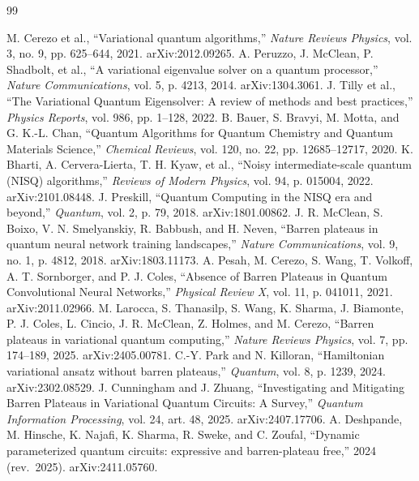 \documentclass[11pt]{article}
\begin{document}

\begin{thebibliography}{99}

 M. Cerezo et al., ``Variational quantum algorithms,'' \textit{Nature Reviews Physics}, vol. 3, no. 9, pp. 625--644, 2021. arXiv:2012.09265.
 A. Peruzzo, J. McClean, P. Shadbolt, et al., ``A variational eigenvalue solver on a quantum processor,'' \textit{Nature Communications}, vol. 5, p. 4213, 2014. arXiv:1304.3061.
 J. Tilly et al., ``The Variational Quantum Eigensolver: A review of methods and best practices,'' \textit{Physics Reports}, vol. 986, pp. 1--128, 2022.
 B. Bauer, S. Bravyi, M. Motta, and G. K.-L. Chan, ``Quantum Algorithms for Quantum Chemistry and Quantum Materials Science,'' \textit{Chemical Reviews}, vol. 120, no. 22, pp. 12685--12717, 2020.
 K. Bharti, A. Cervera-Lierta, T. H. Kyaw, et al., ``Noisy intermediate-scale quantum (NISQ) algorithms,'' \textit{Reviews of Modern Physics}, vol. 94, p. 015004, 2022. arXiv:2101.08448.
 J. Preskill, ``Quantum Computing in the NISQ era and beyond,'' \textit{Quantum}, vol. 2, p. 79, 2018. arXiv:1801.00862.
 J. R. McClean, S. Boixo, V. N. Smelyanskiy, R. Babbush, and H. Neven, ``Barren plateaus in quantum neural network training landscapes,'' \textit{Nature Communications}, vol. 9, no. 1, p. 4812, 2018. arXiv:1803.11173.
 A. Pesah, M. Cerezo, S. Wang, T. Volkoff, A. T. Sornborger, and P. J. Coles, ``Absence of Barren Plateaus in Quantum Convolutional Neural Networks,'' \textit{Physical Review X}, vol. 11, p. 041011, 2021. arXiv:2011.02966.
 M. Larocca, S. Thanasilp, S. Wang, K. Sharma, J. Biamonte, P. J. Coles, L. Cincio, J. R. McClean, Z. Holmes, and M. Cerezo, ``Barren plateaus in variational quantum computing,'' \textit{Nature Reviews Physics}, vol. 7, pp. 174--189, 2025. arXiv:2405.00781.
 C.-Y. Park and N. Killoran, ``Hamiltonian variational ansatz without barren plateaus,'' \textit{Quantum}, vol. 8, p. 1239, 2024. arXiv:2302.08529.
 J. Cunningham and J. Zhuang, ``Investigating and Mitigating Barren Plateaus in Variational Quantum Circuits: A Survey,'' \textit{Quantum Information Processing}, vol. 24, art. 48, 2025. arXiv:2407.17706.
 A. Deshpande, M. Hinsche, K. Najafi, K. Sharma, R. Sweke, and C. Zoufal, ``Dynamic parameterized quantum circuits: expressive and barren-plateau free,'' 2024 (rev.\ 2025). arXiv:2411.05760.

\end{thebibliography}
\end{document}
